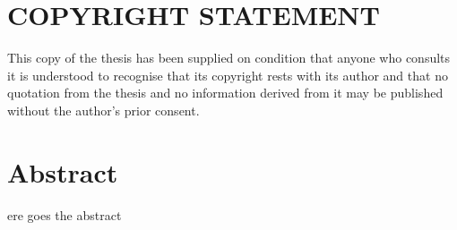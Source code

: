 %
%
%
\chapter*{COPYRIGHT STATEMENT}
\begin{SingleSpace}
This copy of the thesis has been supplied on condition that anyone who consults it is understood to recognise that its copyright rests with its author and that no quotation from the thesis and no information derived from it may be published without the author's prior consent.
\end{SingleSpace}
\clearpage


\chapter*{Abstract}
\begin{SingleSpace}
ere goes the abstract
\end{SingleSpace}
\clearpage


